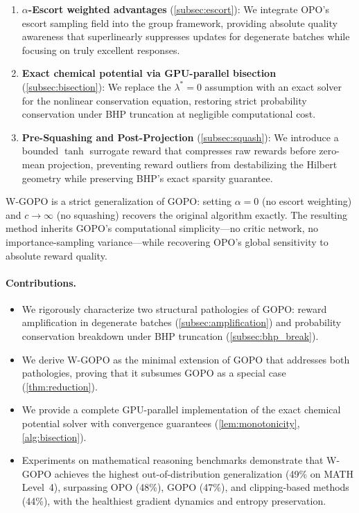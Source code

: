 \documentclass[11pt]{article}
\theoremstyle{definition}
\theoremstyle{remark}
\begin{document}
\begin{enumerate}[leftmargin=2em]
    \item \textbf{$\alpha$-Escort weighted advantages} (\cref{subsec:escort}): We integrate OPO's escort sampling field into the group framework, providing absolute quality awareness that superlinearly suppresses updates for degenerate batches while focusing on truly excellent responses.
    \item \textbf{Exact chemical potential via GPU-parallel bisection} (\cref{subsec:bisection}): We replace the $\lambda^* = 0$ assumption with an exact solver for the nonlinear conservation equation, restoring strict probability conservation under BHP truncation at negligible computational cost.
    \item \textbf{Pre-Squashing and Post-Projection} (\cref{subsec:squash}): We introduce a bounded $\tanh$ surrogate reward that compresses raw rewards before zero-mean projection, preventing reward outliers from destabilizing the Hilbert geometry while preserving BHP's exact sparsity guarantee.
\end{enumerate}

W-GOPO is a strict generalization of GOPO: setting $\alpha = 0$ (no escort weighting) and $c \to \infty$ (no squashing) recovers the original algorithm exactly. The resulting method inherits GOPO's computational simplicity---no critic network, no importance-sampling variance---while recovering OPO's global sensitivity to absolute reward quality.

\paragraph{Contributions.}
\begin{itemize}[leftmargin=2em]
    \item We rigorously characterize two structural pathologies of GOPO: reward amplification in degenerate batches (\cref{subsec:amplification}) and probability conservation breakdown under BHP truncation (\cref{subsec:bhp_break}).
    \item We derive W-GOPO as the minimal extension of GOPO that addresses both pathologies, proving that it subsumes GOPO as a special case (\cref{thm:reduction}).
    \item We provide a complete GPU-parallel implementation of the exact chemical potential solver with convergence guarantees (\cref{lem:monotonicity}, \cref{alg:bisection}).
    \item Experiments on mathematical reasoning benchmarks demonstrate that W-GOPO achieves the highest out-of-distribution generalization (49\% on MATH Level~4), surpassing OPO (48\%), GOPO (47\%), and clipping-based methods (44\%), with the healthiest gradient dynamics and entropy preservation.
\end{itemize}
\end{document}

